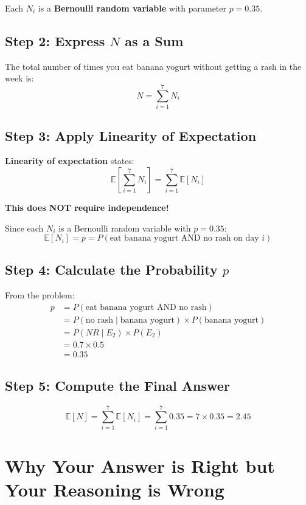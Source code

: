 \documentclass[11pt]{article}
\begin{document}
Each $N_i$ is a \textbf{Bernoulli random variable} with parameter $p = 0.35$.

\subsection*{Step 2: Express $N$ as a Sum}

The total number of times you eat banana yogurt without getting a rash in the week is:
\[
N = \sum_{i=1}^{7} N_i
\]

\subsection*{Step 3: Apply Linearity of Expectation}

\begin{tcolorbox}[colback=green!10, colframe=green!50!black, title=Key Insight]
\textbf{Linearity of expectation} states:
\[
\mathbb{E}\left[\sum_{i=1}^{7} N_i\right] = \sum_{i=1}^{7} \mathbb{E}[N_i]
\]

\textbf{This does NOT require independence!}
\end{tcolorbox}

Since each $N_i$ is a Bernoulli random variable with $p = 0.35$:
\[
\mathbb{E}[N_i] = p = P(\text{eat banana yogurt AND no rash on day } i)
\]

\subsection*{Step 4: Calculate the Probability $p$}

From the problem:
\begin{align*}
p &= P(\text{eat banana yogurt AND no rash}) \\
&= P(\text{no rash} \mid \text{banana yogurt}) \times P(\text{banana yogurt}) \\
&= P(NR \mid E_2) \times P(E_2) \\
&= 0.7 \times 0.5 \\
&= 0.35
\end{align*}

\subsection*{Step 5: Compute the Final Answer}

\[
\mathbb{E}[N] = \sum_{i=1}^{7} \mathbb{E}[N_i] = \sum_{i=1}^{7} 0.35 = 7 \times 0.35 = 2.45
\]

\section*{Why Your Answer is Right but Your Reasoning is Wrong}
\end{document}

